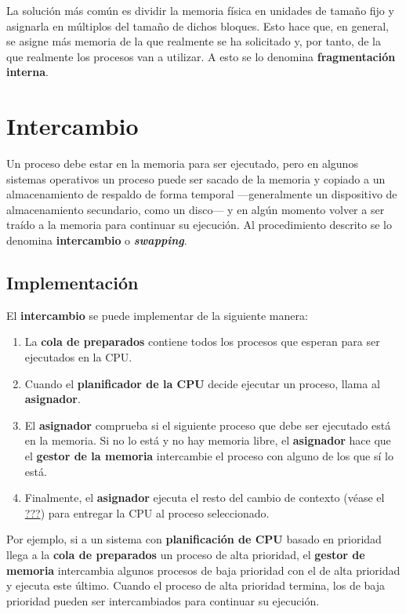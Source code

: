 La solución más común es dividir la memoria física en unidades de tamaño
fijo y asignarla en múltiplos del tamaño de dichos bloques. Esto hace
que, en general, se asigne más memoria de la que realmente se ha
solicitado y, por tanto, de la que realmente los procesos van a
utilizar. A esto se lo denomina \textbf{fragmentación interna}.

\section{Intercambio}\label{_intercambio}

{} {} Un proceso debe estar en la memoria para ser ejecutado, pero en
algunos sistemas operativos un proceso puede ser sacado de la memoria y
copiado a un almacenamiento de respaldo de forma temporal
---generalmente un dispositivo de almacenamiento secundario, como un
disco--- y en algún momento volver a ser traído a la memoria para
continuar su ejecución. Al procedimiento descrito se lo denomina
\textbf{intercambio} o \textbf{\emph{swapping}}.

\subsection{Implementación}\label{_implementaciuxf3n}

El \textbf{intercambio} se puede implementar de la siguiente manera:

\begin{enumerate}
\def\labelenumi{\arabic{enumi}.}
\item
  La \textbf{cola de preparados} contiene todos los procesos que esperan
  para ser ejecutados en la CPU.
\item
  Cuando el \textbf{planificador de la CPU} decide ejecutar un proceso,
  llama al \textbf{asignador}.
\item
  El \textbf{asignador} comprueba si el siguiente proceso que debe ser
  ejecutado está en la memoria. Si no lo está y no hay memoria libre, el
  \textbf{asignador} hace que el \textbf{gestor de la memoria}
  intercambie el proceso con alguno de los que sí lo está.
\item
  Finalmente, el \textbf{asignador} ejecuta el resto del cambio de
  contexto (véase el \hyperref[_cambio_de_contexto]{???}) para entregar
  la CPU al proceso seleccionado.
\end{enumerate}

Por ejemplo, si a un sistema con \textbf{planificación de CPU} basado en
prioridad llega a la \textbf{cola de preparados} un proceso de alta
prioridad, el \textbf{gestor de memoria} intercambia algunos procesos de
baja prioridad con el de alta prioridad y ejecuta este último. Cuando el
proceso de alta prioridad termina, los de baja prioridad pueden ser
intercambiados para continuar su ejecución.

